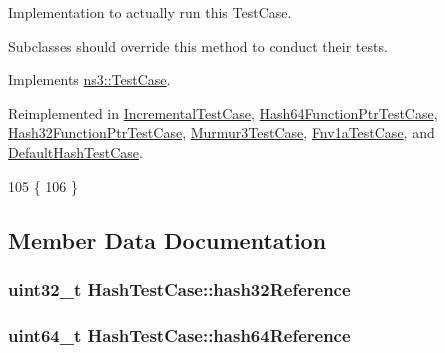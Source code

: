 Implementation to actually run this Test\+Case. 

Subclasses should override this method to conduct their tests. 

Implements \hyperlink{classns3_1_1TestCase_a8ff74680cf017ed42011e4be51917a24}{ns3\+::\+Test\+Case}.



Reimplemented in \hyperlink{classIncrementalTestCase_a8ac4a672673048795b6bd15a6b82eb69}{Incremental\+Test\+Case}, \hyperlink{classHash64FunctionPtrTestCase_ae364f85f2a92f09ad92752745cd8181e}{Hash64\+Function\+Ptr\+Test\+Case}, \hyperlink{classHash32FunctionPtrTestCase_ad4a6c6e792b1a5cae85e12efa0b2f897}{Hash32\+Function\+Ptr\+Test\+Case}, \hyperlink{classMurmur3TestCase_af9ff1f22f068e3f843e23d0dd6358a80}{Murmur3\+Test\+Case}, \hyperlink{classFnv1aTestCase_af33582551e66fdacf529936627c43b25}{Fnv1a\+Test\+Case}, and \hyperlink{classDefaultHashTestCase_aae29a8385ef1f0d2ce1b00b8f8eec9b2}{Default\+Hash\+Test\+Case}.


\begin{DoxyCode}
105 \{
106 \}
\end{DoxyCode}


\subsection{Member Data Documentation}
\subsubsection[{\texorpdfstring{hash32\+Reference}{hash32Reference}}]{\setlength{\rightskip}{0pt plus 5cm}uint32\+\_\+t Hash\+Test\+Case\+::hash32\+Reference\hspace{0.3cm}{\ttfamily [protected]}}\hypertarget{classHashTestCase_ae09d132ca1bd82e42b9beedbf98f9b45}{}\label{classHashTestCase_ae09d132ca1bd82e42b9beedbf98f9b45}
\subsubsection[{\texorpdfstring{hash64\+Reference}{hash64Reference}}]{\setlength{\rightskip}{0pt plus 5cm}uint64\+\_\+t Hash\+Test\+Case\+::hash64\+Reference\hspace{0.3cm}{\ttfamily [protected]}}\hypertarget{classHashTestCase_a5e302abe033e775847dcf8856a94fea2}{}\label{classHashTestCase_a5e302abe033e775847dcf8856a94fea2}
